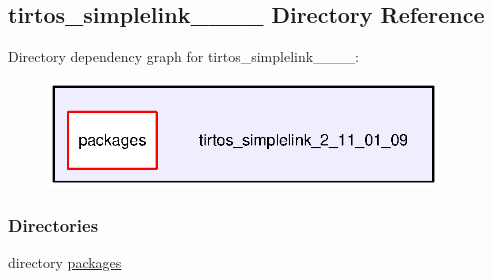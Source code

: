 \subsection{tirtos\-\_\-simplelink\-\_\-\_\-\_\-\_ Directory Reference}
\label{dir_138732f2c96e3b0e8ad59009df8a8c23}
Directory dependency graph for tirtos\-\_\-simplelink\-\_\-\_\-\_\-\_\-:
\nopagebreak
\begin{figure}[H]
\begin{center}
\leavevmode
\includegraphics[width=293pt]{dir_138732f2c96e3b0e8ad59009df8a8c23_dep}
\end{center}
\end{figure}
\subsubsection*{Directories}
\begin{DoxyCompactItemize}
\item 
directory \hyperlink{dir_d1669b12cbe61e7239e718aeb01e04a5}{packages}
\end{DoxyCompactItemize}
